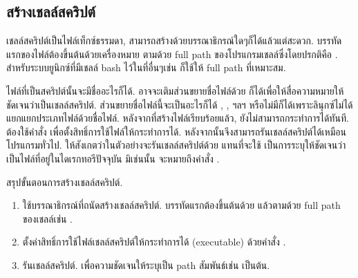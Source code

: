 \begin{thwbr}
\subsection{สร้างเชลล์สคริปต์}
เชลล์สคริปต์เป็นไฟล์เท็กซ์ธรรมดา, สามารถสร้างด้วยบรรณาธิกรณ์ใดๆก็ได้แล้วแต่สะดวก. บรรทัดแรกของไฟล์ต้องขึ้นต้นด้วยเครื่องหมาย \cmd{\#!} ตามด้วย full path ของโปรแกรมเชลล์ซึ่งโดยปรกติคือ . สำหรับระบบยูนิกซ์ที่มีเชลล์ bash ไว้ในที่อื่นๆเช่น  ก็ใช้ให้ full path ที่เหมาะสม.

\begin{MyExample}
\end{MyExample}%

ไฟล์ที่เป็นสคริปต์นั้นจะมีชื่ออะไรก็ได้. อาจจะเติมส่วนขยายชื่อไฟล์ด้วย  ก็ได้เพื่อให้สื่อความหมายให้ชัดเจนว่าเป็นเชลล์สคริปต์. ส่วนขยายชื่อไฟล์นี้จะเป็นอะไรก็ได้ , ,  ฯลฯ หรือไม่มีก็ได้เพราะลินุกซ์ไม่ได้แยกแยกประเภทไฟล์ด้วยชื่อไฟล์. หลังจากที่สร้างไฟล์เรียบร้อยแล้ว, ยังไม่สามารถกระทำการได้ทันที. ต้องใช้คำสั่ง  เพื่อตั้งสิทธิ์การใช้ไฟล์ให้กระทำการได้. หลังจากนั้นจึงสามารถรันเชลล์สคริปต์ได้เหมือนโปรแกรมทั่วไป. ให้สังเกตว่าในตัวอย่างจะรันเชลล์สคริปต์ด้วย  แทนที่จะใช้  เป็นการระบุให้ชัดเจนว่า  เป็นไฟล์ที่อยู่ในไดเรกทอรีปัจจุบัน  มิเช่นนั้น  จะหมายถึงคำสั่ง . 

สรุปขั้นตอนการสร้างเชลล์สคริปต์.
\begin{enumerate}
\item ใช้บรรณาธิกรณ์ที่ถนัดสร้างเชลล์สคริปต์. บรรทัดแรกต้องขึ้นต้นด้วย \cmd{\#!} แล้วตามด้วย full path ของเชลล์เช่น .
\item ตั้งค่าสิทธิ์การใช้ไฟล์เชลล์สคริปต์ให้กระทำการได้ (executable) ด้วยคำสั่ง .
\item รันเชลล์สคริปต์. เพื่อความชัดเจนให้ระบุเป็น path สัมพันธ์เช่น  เป็นต้น.
\end{enumerate}


\end{thwbr}
